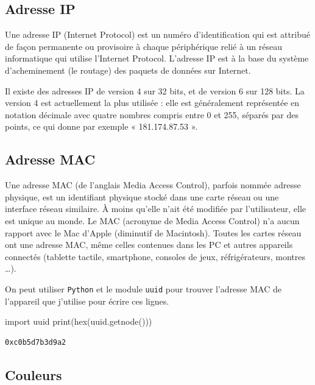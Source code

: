 \documentclass[
  letterpaper,
]{scrbook}
\newenvironment{Shaded}{}{}
\newcommand{\BuiltInTok}[1]{#1}
\newcommand{\ImportTok}[1]{#1}
\newcommand{\NormalTok}[1]{#1}
\theoremstyle{definition}
\theoremstyle{definition}
\theoremstyle{plain}
\theoremstyle{remark}
\begin{document}
\hypertarget{adresse-ip}{%
\subsection{Adresse IP}\label{adresse-ip}}

Une adresse IP (Internet Protocol) est un numéro d'identification qui
est attribué de façon permanente ou provisoire à chaque périphérique
relié à un réseau informatique qui utilise l'Internet Protocol.
L'adresse IP est à la base du système d'acheminement (le routage) des
paquets de données sur Internet.

Il existe des adresses IP de version 4 sur 32 bits, et de version 6 sur
128 bits. La version 4 est actuellement la plus utilisée : elle est
généralement représentée en notation décimale avec quatre nombres
compris entre 0 et 255, séparés par des points, ce qui donne par exemple
« 181.174.87.53 ».

\hypertarget{adresse-mac}{%
\subsection{Adresse MAC}\label{adresse-mac}}

Une adresse MAC (de l'anglais Media Access Control), parfois nommée
adresse physique, est un identifiant physique stocké dans une carte
réseau ou une interface réseau similaire. À moins qu'elle n'ait été
modifiée par l'utilisateur, elle est unique au monde. Le MAC (acronyme
de Media Access Control) n'a aucun rapport avec le Mac d'Apple
(diminutif de Macintosh). Toutes les cartes réseau ont une adresse MAC,
même celles contenues dans les PC et autres appareils connectés
(tablette tactile, smartphone, consoles de jeux, réfrigérateurs, montres
\ldots).

On peut utiliser \texttt{Python} et le module \texttt{uuid} pour trouver
l'adresse MAC de l'appareil que j'utilise pour écrire ces lignes.

\begin{Shaded}
\begin{Highlighting}[]
\ImportTok{import}\NormalTok{ uuid}
\BuiltInTok{print}\NormalTok{(}\BuiltInTok{hex}\NormalTok{(uuid.getnode()))}
\end{Highlighting}
\end{Shaded}

\begin{verbatim}
0xc0b5d7b3d9a2
\end{verbatim}

\hypertarget{couleurs}{%
\subsection{Couleurs}\label{couleurs}}
\end{document}
